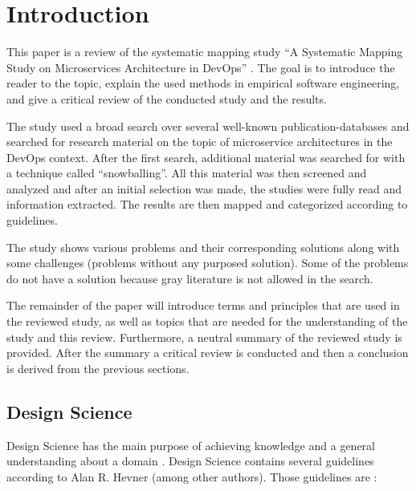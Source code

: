\section{Introduction}

This paper is a review of the systematic mapping study
``A Systematic Mapping Study on Microservices Architecture in DevOps'' \cite{waseem:SMSMSADevOps}.
The goal is to introduce the reader to the topic, explain the used
methods in empirical software engineering, and give a critical review
of the conducted study and the results.

The study used a broad search over several well-known publication-databases
and searched for research material on the topic of microservice architectures
in the DevOps context. After the first search, additional material
was searched for with a technique called ``snowballing''. All this material
was then screened and analyzed and after an initial selection was made,
the studies were fully read and information extracted. The results
are then mapped and categorized according to guidelines.

The study shows various problems and their corresponding solutions
along with some challenges (problems without any purposed solution).
Some of the problems do not have a solution because gray literature is
not allowed in the search.

The remainder of the paper will introduce terms and principles that are used
in the reviewed study, as well as topics that are needed for the understanding
of the study and this review. Furthermore, a neutral summary of the reviewed study
\cite{waseem:SMSMSADevOps} is provided. After the summary a critical review
is conducted and then a conclusion is derived from the previous sections.


\subsection{Design Science}

Design Science has the main purpose of achieving knowledge and a general understanding
about a domain \cite{hevner:DesignScience}. Design Science contains several guidelines
according to Alan R. Hevner (among other authors). Those guidelines are \cite{hevner:DesignScience}:

